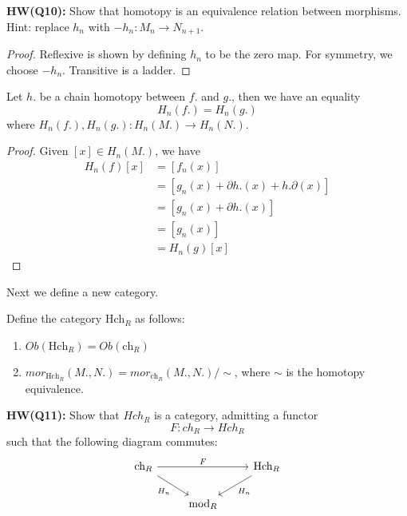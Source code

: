 \begin{prob}
    \textbf{HW(Q10):} Show that homotopy is an equivalence relation between morphisms. Hint: replace $h_n$ with $-h_n: M_n\to N_{n+1}$. 
\end{prob}
\begin{proof}
    Reflexive is shown by defining $h_n$ to be the zero map. For symmetry, we choose $-h_n$. Transitive is a ladder.
\end{proof}
\begin{prop}
    Let $h.$ be a chain homotopy between $f.$ and $g.$, then we have an equality
    \begin{equation*}
        H_n(f.)=H_n(g.)
    \end{equation*}
    where $H_n(f.), H_n(g.): H_n(M.)\to H_n(N.)$.
\end{prop}
\begin{proof}
    Given $[x]\in H_n(M.)$, we have 
    \begin{align*}
        H_n(f)[x]&=[f_n(x)]\\
        &=[g_n(x)+\partial h.(x)+h.\partial(x)]\\
        &=[g_n(x)+\partial h.(x)]\\
        &=[g_n(x)]\\
        &=H_n(g)[x]
    \end{align*}
\end{proof}
Next we define a new category.
\begin{defn}[$Hch_R$]
    Define the category $\text{Hch}_R$ as follows:
    \begin{enumerate}
        \item $Ob(\text{Hch}_R)=Ob(\text{ch}_R)$
        \item $mor_{\text{Hch}_R}(M.,N.)=mor_{\text{ch}_R}(M.,N.)/\sim$, where $\sim$ is the homotopy equivalence.
    \end{enumerate}
\end{defn}
\begin{prob}
    \textbf{HW(Q11):} Show that $Hch_R$ is a category, admitting a functor 
    \begin{equation*}
        F: ch_R\to Hch_R
    \end{equation*}
    such that the following diagram commutes:
    \[\begin{tikzcd}
        {\text{ch}_R} && {\text{Hch}_R} \\
        & {\text{mod}_R}
        \arrow["F", from=1-1, to=1-3]
        \arrow["{H_n}"', from=1-1, to=2-2]
        \arrow["{H_n}", from=1-3, to=2-2]
    \end{tikzcd}\]
\end{prob}
